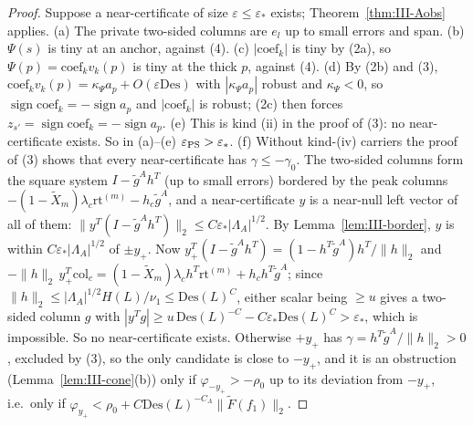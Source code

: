 \documentclass[10pt]{amsart}
\theoremstyle{definition}
\theoremstyle{remark}
\newcommand{\sgn}{\operatorname{sign}}
\begin{document}
\begin{proof}
Suppose a near-certificate of size $\varepsilon\le\varepsilon_*$ exists;
Theorem~\ref{thm:III-Aobs} applies.  (a) The private two-sided columns are
$e_l$ up to small errors and span.  (b) $\Psi(s)$ is tiny at an anchor, against
(4).  (c) $|\mathrm{coef}_k|$ is tiny by (2a), so $\Psi(p)=\mathrm{coef}_kv_k(p)$
is tiny at the thick $p$, against (4).  (d) By (2b) and (3), $\mathrm{coef}_k
v_k(p)=\kappa_\Psi a_p+O(\varepsilon\mathrm{Des})$ with $|\kappa_\Psi a_p|$ robust
and $\kappa_\Psi<0$, so $\sgn\mathrm{coef}_k=-\sgn a_p$ and $|\mathrm{coef}_k|$ is
robust; (2c) then forces $z_{s'}=\sgn\mathrm{coef}_k=-\sgn a_p$.  (e) This is
kind (ii) in the proof of (3): no near-certificate exists.  So in (a)--(e)
$\varepsilon_{\rm PS}>\varepsilon_*$.  (f) Without kind-(iv) carriers the proof of
(3) shows that every near-certificate has $\gamma\le-\gamma_0$.  The two-sided
columns form the square system $I-\tilde g^Ah^T$ (up to small errors) bordered
by the peak columns $-(1-\tilde X_m)\lambda_c\mathrm{rt}^{(m)}-h_c\tilde g^A$, and a
near-certificate $y$ is a near-null left vector of all of them:
$\|y^T(I-\tilde g^Ah^T)\|_2\le C\varepsilon_*|\Lambda_A|^{1/2}$.  By
Lemma~\ref{lem:III-border}, $y$ is within $C\varepsilon_*|\Lambda_A|^{1/2}$ of
$\pm y_+$.  Now $y_+^T(I-\tilde g^Ah^T)=(1-h^T\tilde g^A)h^T/\|h\|_2$ and
$-\|h\|_2\,y_+^T\mathrm{col}_c=(1-\tilde X_m)\lambda_ch^T\mathrm{rt}^{(m)}+
h_ch^T\tilde g^A$; since $\|h\|_2\le|\Lambda_A|^{1/2}H(L)/\nu_1\le\mathrm{Des}(L)^C$,
either scalar being $\ge u$ gives a two-sided column $g$ with $|y^Tg|\ge
u\,\mathrm{Des}(L)^{-C}-C\varepsilon_*\mathrm{Des}(L)^C>\varepsilon_*$, which is
impossible.  So no near-certificate exists.  Otherwise $+y_+$ has $\gamma=h^T\tilde g^A/
\|h\|_2>0$, excluded by (3), so the only candidate is close to $-y_+$, and it is
an obstruction (Lemma~\ref{lem:III-cone}(b)) only if $\varphi_{-y_+}>-\rho_0$ up to
its deviation from $-y_+$, i.e.\ only if $\varphi_{y_+}<\rho_0+C\mathrm{Des}(L)^{
-C_A}\|\tilde F(f_1)\|_2$.
\end{proof}
\end{document}
